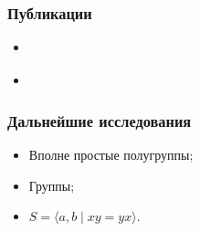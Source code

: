 \documentclass[11pt, notheorems]{beamer}
\begin{document}
\begin{frame}
	\frametitle{Публикации}

	\begin{itemize}
		\item \cite{flat_unars}
		\item \cite{pryan:unars_close_to_flat}
	\end{itemize}

\end{frame}

\begin{frame}
	\frametitle{Дальнейшие исследования}

	\begin{itemize}
		\item Вполне простые полугруппы;
		\item Группы;
		\item $S = \langle a, b \mid xy = yx \rangle$.
	\end{itemize}

\end{frame}
\end{document}
